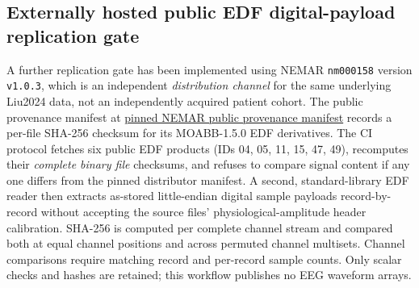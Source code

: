 \subsection{Externally hosted public EDF digital-payload replication gate}
\label{sec:p2-nemar-real-gate}
A further replication gate has been implemented using
NEMAR \texttt{nm000158} version \texttt{v1.0.3}, which is an
independent \emph{distribution channel} for the same
underlying Liu2024 data, not an independently acquired
patient cohort. The public provenance manifest at
\href{https://github.com/nemarDatasets/nm000158/blob/11e3eeb4b439d5f8ee1b5e3b8e6032824bc2de83/sourcedata/sourcedata_provenance.json}{pinned NEMAR public provenance manifest}
records a per-file SHA-256 checksum for its MOABB-1.5.0 EDF
derivatives. The CI protocol fetches six public EDF
products (IDs 04, 05, 11, 15, 47, 49), recomputes their
\emph{complete binary file} checksums, and refuses to
compare signal content if any one differs from the pinned
distributor manifest. A second, standard-library EDF
reader then extracts as-stored little-endian digital sample
payloads record-by-record without accepting the source
files' physiological-amplitude header calibration.
SHA-256 is computed per complete channel stream and
compared both at equal channel positions and across
permuted channel multisets. Channel comparisons require
matching record and per-record sample counts.
Only scalar checks and hashes are retained; this
workflow publishes no EEG waveform arrays.

